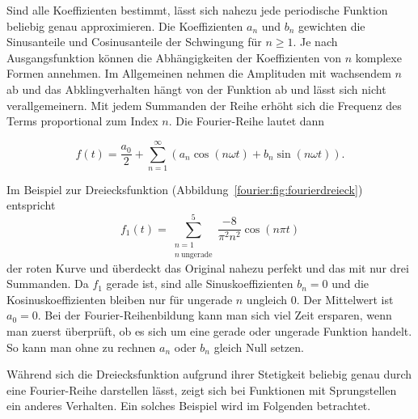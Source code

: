 Sind alle Koeffizienten bestimmt, lässt sich nahezu jede periodische Funktion beliebig genau approximieren.
Die Koeffizienten $a_n$ und $b_n$ gewichten die Sinusanteile und Cosinusanteile der Schwingung für $n \ge 1$.
Je nach Ausgangsfunktion können die Abhängigkeiten der Koeffizienten von $n$ komplexe Formen annehmen.
Im Allgemeinen nehmen die Amplituden mit wachsendem $n$ ab und das Abklingverhalten hängt von der Funktion ab und lässt sich nicht verallgemeinern.
Mit jedem Summanden der Reihe erhöht sich die Frequenz des Terms proportional zum Index $n$.
Die Fourier-Reihe lautet dann 

\begin{equation}\label{eq:fourier}
f(t) = \frac{a_0}{2} + \sum_{n=1}^{\infty} \left( a_n \cos\left( n\omega t \right) + b_n \sin\left( n \omega t \right) \right).
\end{equation}


\begin{beispiel}

Im Beispiel zur Dreiecksfunktion (Abbildung~\ref{fourier:fig:fourierdreieck}) entspricht  
\begin{equation}
	f_1(t) = \sum_{\substack{n=1 \\ n\ \text{ungerade}}}^{5} \frac{-8}{\pi^2 n^2} \cos(n\pi t)
\end{equation}
der roten Kurve und überdeckt das Original nahezu perfekt und das mit nur drei Summanden.  
Da $f_1$ gerade ist, sind alle Sinuskoeffizienten $b_n=0$ und die Kosinuskoeffizienten bleiben nur für ungerade $n$ ungleich $0$.  
Der Mittelwert ist $a_0=0$.  
Bei der Fourier-Reihenbildung kann man sich viel Zeit ersparen, wenn man zuerst überprüft, ob es sich um eine gerade oder ungerade Funktion handelt.
So kann man ohne zu rechnen $a_n$ oder $b_n$ gleich Null setzen.

\end{beispiel}

Während sich die Dreiecksfunktion aufgrund ihrer Stetigkeit beliebig genau durch eine Fourier-Reihe darstellen lässt, zeigt sich bei Funktionen mit Sprungstellen ein anderes Verhalten. Ein solches Beispiel wird im Folgenden betrachtet.

